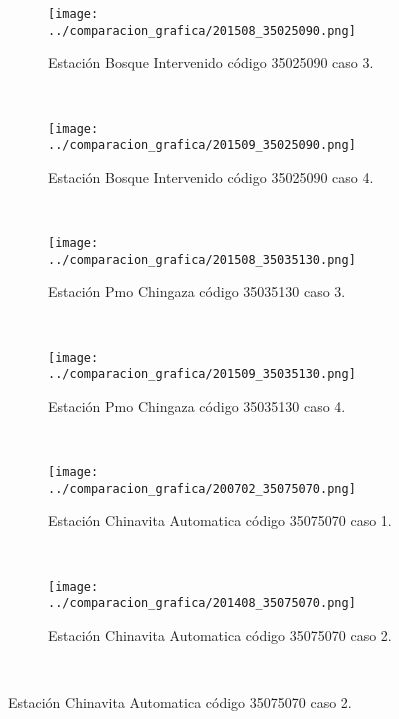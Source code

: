 \begin{figure}[H]\ContinuedFloat
\centering
\begin{subfigure}[normla]{0.4\textwidth}
\caption{Estación Bosque Intervenido   código 35025090 caso 3.}
\texttt{[image: ../comparacion\_grafica/201508\_35025090.png]}
\end{subfigure}
~
\begin{subfigure}[normla]{0.4\textwidth}
\caption{Estación Bosque Intervenido   código 35025090 caso 4.}
\texttt{[image: ../comparacion\_grafica/201509\_35025090.png]}
\end{subfigure}
~
\begin{subfigure}[normla]{0.4\textwidth}
\caption{Estación Pmo Chingaza código 35035130 caso 3.}
\texttt{[image: ../comparacion\_grafica/201508\_35035130.png]}
\end{subfigure}
~
\begin{subfigure}[normla]{0.4\textwidth}
\caption{Estación Pmo Chingaza código 35035130 caso 4.}
\texttt{[image: ../comparacion\_grafica/201509\_35035130.png]}
\end{subfigure}
~
\begin{subfigure}[normla]{0.4\textwidth}
\caption{Estación Chinavita Automatica código 35075070 caso 1.}
\texttt{[image: ../comparacion\_grafica/200702\_35075070.png]}
\end{subfigure}
~
\begin{subfigure}[normla]{0.4\textwidth}
\caption{Estación Chinavita Automatica código 35075070 caso 2.}
\texttt{[image: ../comparacion\_grafica/201408\_35075070.png]}
\end{subfigure}
~
\end{figure}
           
